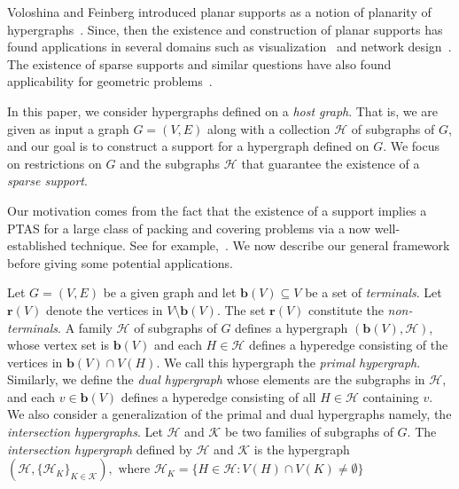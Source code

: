 \documentclass[12pt]{article}
\newcommand{\R}{\mathbf{r}}
\newcommand{\B}{\mathbf{b}}
\theoremstyle{case}
\begin{document}
Voloshina and Feinberg introduced planar supports as a notion of planarity of hypergraphs~\cite{voloshina1984planarity}.
Since, then the existence and construction of planar supports has found applications in several domains such as visualization~\cite{bereg2015colored,bereg2011red,brandes2010blocks,brandes2012path,buchin2011planar,havet2022overlaying,hurtado2018colored} and network design~\cite{anceaume2006semantic,baldoni2007tera,baldoni2007efficient,chand2005semantic,hosoda2012approximability,korach2003clustering,onus2011minimum}.
The existence of sparse supports and similar questions have also found applicability for geometric problems~\cite{Mustafa17,BasuRoy2018,Cohen-AddadM15,krohn2014guarding,mustafa2010improved,RR18}.

In this paper, we consider hypergraphs defined on a \emph{host graph}. That is, we are given as input a graph $G=(V,E)$ along with a collection $\mathcal{H}$
of subgraphs of $G$, and our goal is to construct a support for a 
hypergraph defined on $G$. 
We focus on restrictions on $G$ and the subgraphs $\mathcal{H}$ 
that guarantee the existence of a \emph{sparse support}.

Our motivation comes from the fact that the existence of a support implies
a PTAS for a large class of packing and covering problems via a now well-established
technique. See for example,~\cite{DBLP:conf/walcom/AschnerKMY13,ChanH12, mustafa2010improved, RR18,raman2025supportsgraphsboundedgenus}. We now describe our general framework before
giving some potential applications. 

Let $G=(V,E)$ be a given graph and let 
$\B(V)\subseteq V$ be a set of \emph{terminals}.
Let $\R(V)$ denote the vertices in $V\setminus\B(V)$.
The set $\R(V)$ constitute the \emph{non-terminals}.
A family $\mathcal{H}$ of subgraphs of $G$
defines a hypergraph $(\B(V),\mathcal{H})$, 
whose vertex set is $\B(V)$ and
each $H\in\mathcal{H}$ defines a hyperedge 
consisting of the vertices in $\B(V)\cap V(H)$.
We call this hypergraph the \emph{primal hypergraph}.
Similarly, we define the \emph{dual hypergraph}
whose elements are the subgraphs in $\mathcal{H}$, and each $v\in\B(V)$ defines
a hyperedge consisting of all $H\in\mathcal{H}$ containing $v$.
We also consider a generalization of the primal and dual hypergraphs namely, the \emph{intersection hypergraphs}. 
Let $\mathcal{H}$ and $\mathcal{K}$ be two families of subgraphs of $G$.
The \emph{intersection hypergraph} defined by $\mathcal{H}$ and $\mathcal{K}$
is the hypergraph 
$
(\mathcal{H},\{\mathcal{H}_K\}_{K\in\mathcal{K}}),\mbox{ where } \mathcal{H}_K=\{H\in\mathcal{H}:V(H)\cap V(K)\ne\emptyset\}
$
\end{document}
